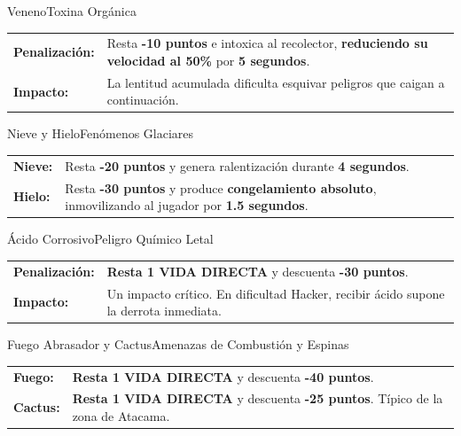 \documentclass[11pt,a4paper]{article}
\begin{document}
\vspace{0.3cm}

\begin{tarjetaitem}{Veneno}{Toxina Orgánica}
    \begin{tabularx}{\textwidth}{lX}
        \textbf{Penalización:} & Resta \textbf{-10 puntos} e intoxica al recolector, \textbf{reduciendo su velocidad al 50\%} por \textbf{5 segundos}. \\
        \textbf{Impacto:} & La lentitud acumulada dificulta esquivar peligros que caigan a continuación.
    \end{tabularx}
\end{tarjetaitem}

\vspace{0.3cm}

\begin{tarjetaitem}{Nieve y Hielo}{Fenómenos Glaciares}
    \begin{tabularx}{\textwidth}{lX}
        \textbf{Nieve:} & Resta \textbf{-20 puntos} y genera ralentización durante \textbf{4 segundos}. \\
        \textbf{Hielo:} & Resta \textbf{-30 puntos} y produce \textbf{congelamiento absoluto}, inmovilizando al jugador por \textbf{1.5 segundos}.
    \end{tabularx}
\end{tarjetaitem}

\vspace{0.3cm}

\begin{tarjetaitem}{Ácido Corrosivo}{Peligro Químico Letal}
    \begin{tabularx}{\textwidth}{lX}
        \textbf{Penalización:} & \textbf{Resta 1 VIDA DIRECTA} y descuenta \textbf{-30 puntos}. \\
        \textbf{Impacto:} & Un impacto crítico. En dificultad Hacker, recibir ácido supone la derrota inmediata.
    \end{tabularx}
\end{tarjetaitem}

\vspace{0.3cm}

\begin{tarjetaitem}{Fuego Abrasador y Cactus}{Amenazas de Combustión y Espinas}
    \begin{tabularx}{\textwidth}{lX}
        \textbf{Fuego:} & \textbf{Resta 1 VIDA DIRECTA} y descuenta \textbf{-40 puntos}. \\
        \textbf{Cactus:} & \textbf{Resta 1 VIDA DIRECTA} y descuenta \textbf{-25 puntos}. Típico de la zona de Atacama.
    \end{tabularx}
\end{tarjetaitem}
\end{document}
